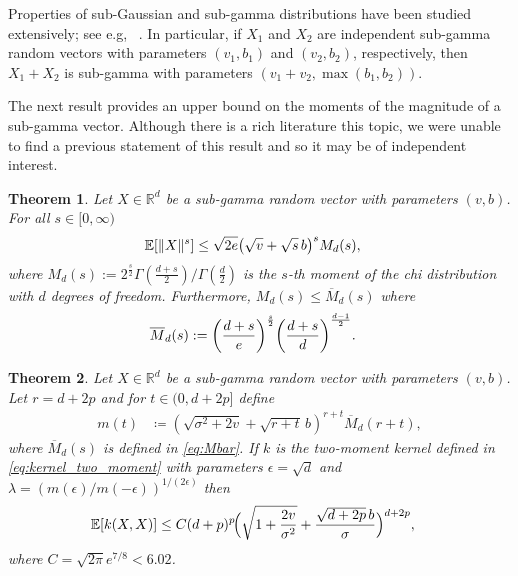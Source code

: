 \documentclass{article}
\newtheorem{theorem}{Theorem}
\theoremstyle{definition}
\newcommand{\reals}{\mathbb{R}}
\newcommand{\ex}[1]{\ensuremath{\mathbb{E}\left[ #1\right]}}
\newcommand{\eps}{\epsilon}
\newcommand{\nb}[1]{{\textcolor{blue}{[#1]}}}
\let\originalleft\left
\let\originalright\right
\renewcommand{\left}{\mathopen{}\mathclose\bgroup\originalleft}
\renewcommand{\right}{\aftergroup\egroup\originalright}
\newcommand{\xc}[1]{\textcolor{orange}{\textsf{XC: #1}}}
\begin{document}
Properties of sub-Gaussian and sub-gamma distributions have been studied extensively; see e.g, ~\cite{boucheron2013concentration}. In particular,  if  $X_1$ and $X_2$ are independent sub-gamma random vectors with parameters $(v_1, b_1)$ and $(v_2, b_2)$, respectively, then $X_1 +X_2$ is  sub-gamma with parameters $(v_1 + v_2, \max(b_1, b_2))$. 

The next result provides an upper bound on the moments of the magnitude of a sub-gamma vector. Although there is a rich literature this topic, we were unable to find a previous statement of this result and so it may be of independent interest. %

\begin{theorem}\label{lem:subgamma_bnd}
Let $X \in \reals^d$ be a sub-gamma random vector with parameters $(v, b)$. For all $s \in [0, \infty)$ 
\begin{align}
\ex{ \|X\|^s}  & \le  \sqrt{ 2 e} \left(  \sqrt{v}  + \sqrt{s}\, b  \right)^s  M_d(s),
\end{align} 
where  $M_{d} (s) :=  2^\frac{s}{2} \Gamma(\frac{d+s}{2}) / \Gamma(\frac{d}{2})$ is the $s$-th moment of the chi distribution with $d$ degrees of freedom. Furthermore, $M_d(s) \le \overline{M}_d(s)$ where
\begin{align}
\overline{M}_d(s)%
&: = \left( \frac{ d + s}{e} \right)^\frac{s}{2} \left( \frac{ d + s}{ d} \right)^\frac{d-1}{2}. \label{eq:Mbar}
\end{align} 
\end{theorem}


\begin{theorem}\label{thm_kbound_subgamma} 
Let $X \in \reals^d$ be a sub-gamma random vector with parameters $(v, b)$. Let $r = d + 2p$ and for $t \in (0, d + 2p]$ define
\begin{align*} 
m(t) &\coloneqq (  \sqrt{\sigma^2 + 2 v} +  \sqrt{r + t} \,b  )^{r + t}  \overline{M}_{d}(r +  t),
\end{align*}
where $\overline{M}_d(s)$ is defined in \eqref{eq:Mbar}. If  $k$ is the two-moment kernel defined in \eqref{eq:kernel_two_moment} with  parameters $\eps = \sqrt{d}$ and $\lambda = (m(\eps)  / m(-\eps) )^{1/(2 \eps)}$  then
\begin{align}
 \ex{ k(X,X)}
 & \le  C (d + p)^p \! \Big(  \sqrt{1 +  \frac{2v}{\sigma^2}} +   \frac{\sqrt{d+2p} \,b}{\sigma}  \Big)^{d+2p}    ,
 \label{eq_ub-cor-subgamma}
 \end{align}
 where $C= \sqrt{2 \pi}  e^{7/8} < 6.02$.%
\end{theorem}
\end{document}
